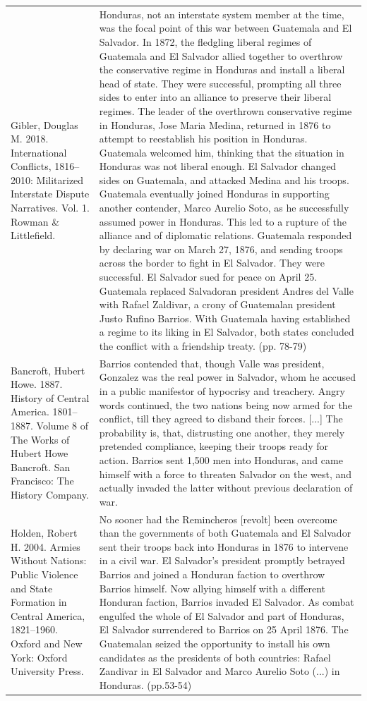 {\begin{longtable}{p{}p{}}
Gibler, Douglas M. 2018. International Conflicts, 1816–2010: Militarized Interstate Dispute Narratives. Vol. 1. Rowman \& Littlefield. & Honduras, not an interstate system member at the time, was the focal point of this war between Guatemala and El Salvador. In 1872, the fledgling liberal regimes of Guatemala and El Salvador allied together to overthrow the conservative regime in Honduras and install a liberal head of state. They were successful, prompting all three sides to enter into an alliance to preserve their liberal regimes. The leader of the overthrown conservative regime in Honduras, Jose Maria Medina, returned in 1876 to attempt to reestablish his position in Honduras. Guatemala welcomed him, thinking that the situation in Honduras was not liberal enough. El Salvador changed sides on Guatemala, and attacked Medina and his troops. Guatemala eventually joined Honduras in supporting another contender, Marco Aurelio Soto, as he successfully assumed power in Honduras. This led to a rupture of the alliance and of diplomatic relations. Guatemala responded by declaring war on March 27, 1876, and sending troops across the border to fight in El Salvador. They were successful. El Salvador sued for peace on April 25. Guatemala replaced Salvadoran president Andres del Valle with Rafael Zaldivar, a crony of Guatemalan president Justo Rufino Barrios. With Guatemala having established a regime to its liking in El Salvador, both states concluded the conflict with a friendship treaty. (pp. 78-79)
\\
Bancroft, Hubert Howe. 1887. History of Central America. 1801–1887. Volume 8 of The Works of Hubert Howe Bancroft. San Francisco: The History Company. & Barrios contended that, though Valle was president, Gonzalez was the real power in Salvador, whom he accused in a public manifestor of hypocrisy and treachery. Angry words continued, the two nations being now armed for the conflict, till they agreed to disband their forces. [...] The probability is, that, distrusting one another, they merely pretended compliance, keeping their troops ready for action. Barrios sent 1,500 men into Honduras, and came himself with a force to threaten Salvador on the west, and actually invaded the latter without previous declaration of war.
\\
Holden, Robert H. 2004. Armies Without Nations: Public Violence and State Formation in Central America, 1821–1960. Oxford and New York: Oxford University Press. & No sooner had the Remincheros [revolt] been overcome than the governments of both Guatemala and El Salvador sent their troops back into Honduras in 1876 to intervene in a civil war. El Salvador's president promptly betrayed Barrios and joined a Honduran faction to overthrow Barrios himself. Now allying himself with a different Honduran faction, Barrios invaded El Salvador. As combat engulfed the whole of El Salvador and part of Honduras, El Salvador surrendered to Barrios on 25 April 1876. The Guatemalan seized the opportunity to install his own candidates as the presidents of both countries: Rafael Zandivar in El Salvador and Marco Aurelio Soto (...) in Honduras. (pp.53-54)

\end{longtable}}
